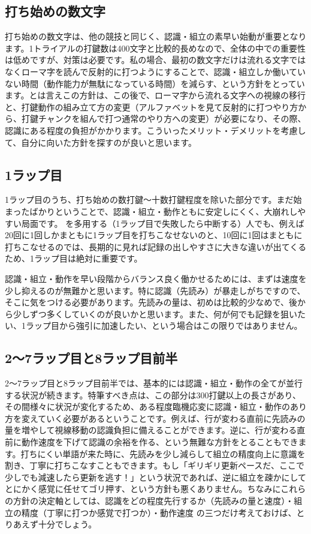 \subsection{打ち始めの数文字}

打ち始めの数文字は、他の競技と同じく、認識・組立の素早い始動が重要となります。1トライアルの打鍵数は400文字と比較的長めなので、全体の中での重要性は低めですが、対策は必要です。私の場合、最初の数文字だけは流れる文字ではなくローマ字を読んで反射的に打つようにすることで、認識・組立しか働いていない時間（動作能力が無駄になっている時間）を減らす、という方針をとっています。とは言えこの方針は、この後で、ローマ字から流れる文字への視線の移行と、打鍵動作の組み立て方の変更（アルファベットを見て反射的に打つやり方から、打鍵チャンクを組んで打つ通常のやり方への変更）が必要になり、その際、認識にある程度の負担がかかります。こういったメリット・デメリットを考慮して、自分に向いた方針を探すのが良いと思います。

\subsection{1ラップ目}

1ラップ目のうち、打ち始めの数打鍵～十数打鍵程度を除いた部分です。まだ始まったばかりということで、認識・組立・動作ともに安定しにくく、大崩れしやすい局面です。 を多用する（1ラップ目で失敗したら中断する）人でも、例えば20回に1回しかまともに1ラップ目を打ちこなせないのと、10回に1回はまともに打ちこなせるのでは、長期的に見れば記録の出しやすさに大きな違いが出てくるため、1ラップ目は絶対に重要です。

認識・組立・動作を早い段階からバランス良く働かせるためには、まずは速度を少し抑えるのが無難かと思います。特に認識（先読み）が暴走しがちですので、そこに気をつける必要があります。先読みの量は、初めは比較的少なめで、後から少しずつ多くしていくのが良いかと思います。また、何が何でも記録を狙いたい、1ラップ目から強引に加速したい、という場合はこの限りではありません。

\subsection{2～7ラップ目と8ラップ目前半}

2～7ラップ目と8ラップ目前半では、基本的には認識・組立・動作の全てが並行する状況が続きます。特筆すべき点は、この部分は300打鍵以上の長さがあり、その間様々に状況が変化するため、ある程度臨機応変に認識・組立・動作のあり方を変えていく必要があるということです。例えば、行が変わる直前に先読みの量を増やして視線移動の認識負担に備えることができます。逆に、行が変わる直前に動作速度を下げて認識の余裕を作る、という無難な方針をとることもできます。打ちにくい単語が来た時に、先読みを少し減らして組立の精度向上に意識を割き、丁寧に打ちこなすこともできます。もし「ギリギリ更新ペースだ、ここで少しでも減速したら更新を逃す！」という状況であれば、逆に組立を疎かにしてとにかく感覚に任せてゴリ押す、という方針も悪くありません。ちなみにこれらの方針の決定軸としては、認識をどの程度先行するか（先読みの量と速度）・組立の精度（丁寧に打つか感覚で打つか）・動作速度 の三つだけ考えておけば、とりあえず十分でしょう。

